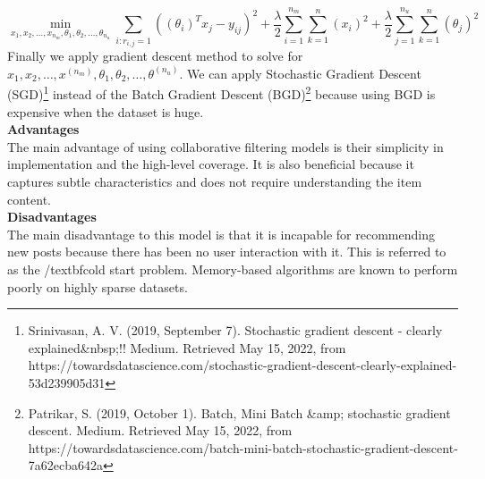 \begin{equation*}
\min_{x_{1},x_{2}, \dots,x_{n_{m}}, \theta_{1},\theta_{2}, \dots, \theta_{n_{u}} } 
\sum_{i:r_{i,j} = 1}\left((\theta_{i})^{T}x_{j}-y_{ij}\right)^{2} + 
\frac{\lambda}{2}
\sum_{i=1}^{n_{m}}
\sum_{k = 1}^{n}(x_{i})^{2}+
\frac{\lambda}{2}
\sum_{j=1}^{n_{u}}
\sum_{k = 1}^{n}(\theta_{j})^{2}
\end{equation*}
Finally we apply gradient descent method to solve for $x_{1},x_{2}, \dots,x^{(n_{m})}, \theta_{1},\theta_{2}, \dots, \theta^{(n_{u})}$. We can apply Stochastic Gradient Descent (SGD)\footnote{Srinivasan, A. V. (2019, September 7). Stochastic gradient descent - clearly explained&nbsp;!! Medium. Retrieved May 15, 2022, from https://towardsdatascience.com/stochastic-gradient-descent-clearly-explained-53d239905d31 } instead of the Batch Gradient Descent (BGD)\footnote{Patrikar, S. (2019, October 1). Batch, Mini Batch &amp; stochastic gradient descent. Medium. Retrieved May 15, 2022, from https://towardsdatascience.com/batch-mini-batch-stochastic-gradient-descent-7a62ecba642a} because using BGD is expensive when the dataset is huge. 
\\\textbf{Advantages}
\\The main advantage of using collaborative filtering models is their simplicity in implementation and the high-level coverage. It is also beneficial because it captures subtle characteristics and does not require understanding the item content.
\\ \textbf{Disadvantages}
\\The main disadvantage to this model is that it is incapable  for recommending new posts because there has been no user interaction with it. This is referred to as the /textbf{cold start} problem. Memory-based algorithms are known to perform poorly on highly sparse datasets.


